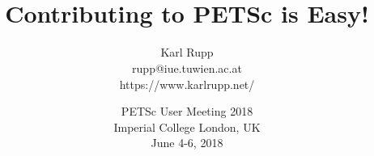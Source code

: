 \documentclass[usepdftitle=false,9pt]{beamer}
\author[Karl Rupp]{Karl Rupp \\ \ttfamily rupp@iue.tuwien.ac.at \\ https://www.karlrupp.net/}
\institute[IuE]
{ \footnotesize
  Institute for Microelectronics, TU Wien \\[1em]
}
\title[PETSc]{ \vspace*{1cm}\\ {Contributing to PETSc is Easy!} %
             }
\date[PETSc 2018, June 4-6, 2018]{ \footnotesize PETSc User Meeting 2018 \\[1em] Imperial College London, UK \\[1em] June 4-6, 2018}
\begin{document}
\begin{frame}[plain]
 \frametitle{~}
 \titlepage
\end{frame}


\end{document}
